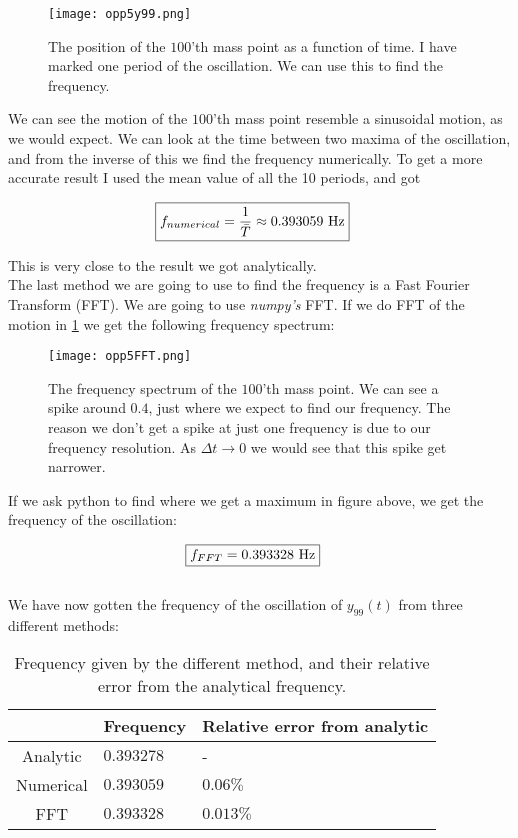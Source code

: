 \documentclass[a4paper,norsk, 10pt]{article}
\begin{document}
\begin{figure}[H]
\centering
\texttt{[image: opp5y99.png]}
\caption{The position of the $100$'th mass point as a function of time. I have marked one period of the oscillation. We can use this to find the frequency.}
\label{fig:y99}
\end{figure}

We can see the motion of the $100$'th mass point resemble a sinusoidal motion, as we would expect. We can look at the time between two maxima of the oscillation, and from the inverse of this we find the frequency numerically. To get a more accurate result I used the mean value of all the 10 periods, and got

\begin{align}
\Aboxed{f_{numerical} = \frac{1}{\bar{T}} \approx 0.393059 \text{ Hz}}
\end{align}

This is very close to the result we got analytically.\\

The last method we are going to use to find the frequency is a Fast Fourier Transform (FFT). We are going to use \textit{numpy's} FFT. If we do FFT of the motion in \ref{fig:y99} we get the following frequency spectrum:

\begin{figure}[H]
\centering
\texttt{[image: opp5FFT.png]}
\caption{The frequency spectrum of the $100$'th mass point. We can see a spike around $0.4$, just where we expect to find our frequency. The reason we don't get a spike at just one frequency is due to our frequency resolution. As $\Delta t \rightarrow 0$ we would see that this spike get narrower.}
\label{fig:FFTy99}
\end{figure}

If we ask python to find where we get a maximum in figure above, we get the frequency of the oscillation:

\begin{align}
\Aboxed{f_{FFT} = 0.393328 \text{ Hz}}
\end{align}\\

We have now gotten the frequency of the oscillation of $y_{99}(t)$ from three different methods:

\begin{table}[H]
\centering
\begin{tabular}{|c|l|l|}
\hline
& Frequency & Relative error from analytic\\\hline
Analytic & $0.393278$ & - \\\hline
Numerical & $0.393059$ & $0.06\%$ \\\hline
FFT & $0.393328$ & $0.013\%$ \\\hline
\end{tabular}
\caption{Frequency given by the different method, and their relative error from the analytical frequency.}
\end{table}
\end{document}
